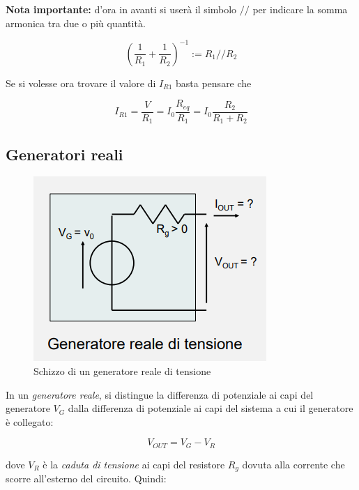 \documentclass{article}
\begin{document}
\vspace{3mm}

\textbf{Nota importante:} d'ora in avanti si userà il simbolo $//$ per indicare la somma armonica tra due o più quantità.

\[\displaystyle{\left(\frac{1}{R_1}+\frac{1}{R_2}\right)^{-1}:= R_1//R_2}\]

\vspace{3mm}

Se si volesse ora trovare il valore di $I_{R1}$ basta pensare che

\[I_{R1} = \frac{V}{R_1} = I_0 \frac{R_{eq}}{R_1} = I_0 \frac{R_2}{R_1 + R_2}\]

\clearpage










\subsection{Generatori reali}

\begin{figure}[h]
  \centering
  \includegraphics[scale=0.5]{IM_generatori_reali_tensione}
  \caption{Schizzo di un generatore reale di tensione}
  \label{Schema_generatore_reale_tensione}
\end{figure}

In un \textit{generatore reale}, si distingue la differenza di potenziale ai capi del generatore $V_G$ dalla differenza di potenziale ai capi del sistema a cui il generatore è collegato:

\[V_{OUT} = V_G - V_R\]

dove $V_R$ è la \textit{caduta di tensione} ai capi del resistore $R_g$ dovuta alla corrente che scorre all'esterno del circuito. Quindi:
\end{document}
